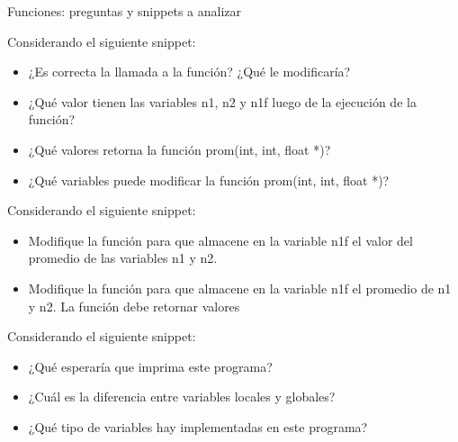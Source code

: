 \documentclass[xcolor=pdftex,table,11pt]{beamer}
\begin{document}
\begin{frame}[allowframebreaks]{Funciones: preguntas y snippets a analizar}
\begin{itemize}
\end{itemize}

\newpage
Considerando el siguiente snippet:

\codesetstylefrombeamer
{}


\begin{itemize}

\item ¿Es correcta la llamada a la función? ¿Qué le modificaría?
\item ¿Qué valor tienen las variables n1, n2 y n1f luego de la ejecución de la función?

\item ¿Qué valores retorna la función prom(int, int, float *)?

\item ¿Qué variables puede modificar la función prom(int, int, float *)?


\end{itemize}

\newpage
Considerando el siguiente snippet:

\codesetstylefrombeamer
{}


\begin{itemize}

\item Modifique la función para que almacene en la variable n1f el valor del promedio de las variables n1 y n2.

\item Modifique la función para que almacene en la variable n1f el promedio de n1 y n2. La función debe retornar valores
\end{itemize}
 


\newpage
Considerando el siguiente snippet:

\codesetstylefrombeamer
{}


\begin{itemize}

\item ¿Qué esperaría que imprima este programa?

\item ¿Cuál es la diferencia entre variables locales y globales?

\item ¿Qué tipo de variables hay implementadas en este programa?

\end{itemize}


\end{frame}
\end{document}
